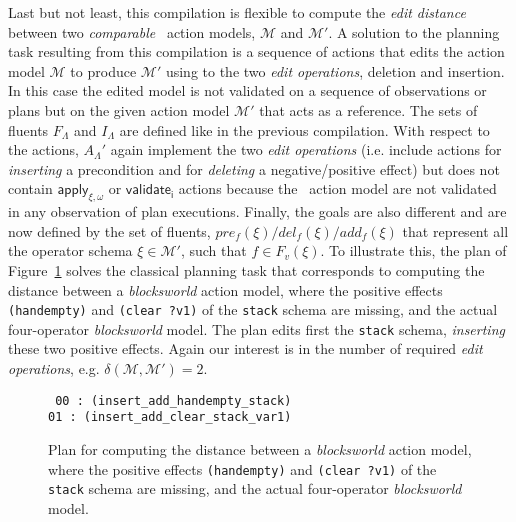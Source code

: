 Last but not least, this compilation is flexible to compute the {\em edit distance} between two {\em comparable} \strips\ action models, $\mathcal{M}$ and $\mathcal{M}'$. A solution to the planning task resulting from this compilation is a sequence of actions that edits the action model $\mathcal{M}$ to produce $\mathcal{M}'$ using to the two {\em edit operations}, deletion and insertion. In this case the edited model is not validated on a sequence of observations or plans but on the given action model $\mathcal{M}'$ that acts as a reference. The sets of fluents $F_{\Lambda}$ and $I_{\Lambda}$ are defined like in the previous compilation. With respect to the actions, $A_{\Lambda}'$ again implement the two {\em edit operations} (i.e. include actions for {\em inserting} a precondition and for {\em deleting} a negative/positive effect) but does not contain $\mathsf{apply_{\xi,\omega}}$ or $\mathsf{validate_{i}}$ actions because the \strips\ action model are not validated in any observation of plan executions. Finally, the goals are also different and are now defined by the set of fluents, $pre_f(\xi)/del_f(\xi)/add_f(\xi)$ that represent all the operator schema $\xi\in\mathcal{M'}$, such that $f\in F_v(\xi)$. To illustrate this, the plan of Figure~\ref{fig:plan-mdistance} solves the classical planning task that corresponds to computing the distance between a \emph{blocksworld} action model, where the positive effects {\tt\small (handempty)} and {\tt\small (clear ?v1)} of the {\tt\small stack} schema are missing, and the actual four-operator {\em blocksworld} model. The plan edits first the {\tt\small stack} schema, {\em inserting} these two positive effects. Again our interest is in the number of required {\em edit operations}, e.g. $\delta(\mathcal{M},\mathcal{M'})=2$.

\begin{figure}[hbt!]
{\tt\small
00 : (insert\_add\_handempty\_stack)\\
01 : (insert\_add\_clear\_stack\_var1)
}
 \caption{\small Plan for computing the distance between a \emph{blocksworld} action model, where the positive effects {\tt\small (handempty)} and {\tt\small (clear ?v1)} of the {\tt\small stack} schema are missing, and the actual four-operator {\em blocksworld} model.}
\label{fig:plan-mdistance}
\end{figure}









